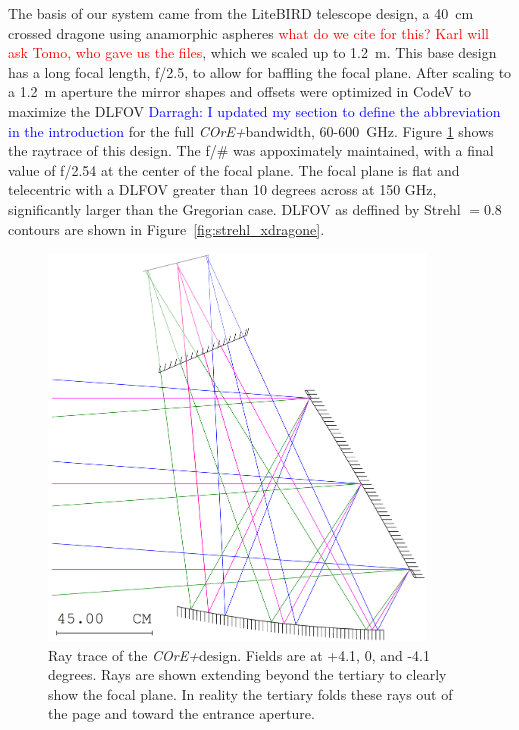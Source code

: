 \documentclass[11pt,a4paper]{article}
\newcommand{\comred}[1]{\textcolor{red}{#1}}
\newcommand{\comblue}[1]{\textcolor{blue}{#1}}
\newcommand{\coreplus}{\textit{\negthinspace COrE+\/}}
\begin{document}
The basis of our system came from the LiteBIRD telescope design, a 40~cm crossed dragone using anamorphic 
aspheres 
\cite{litebird} \comred{what do we cite for this? Karl will ask Tomo, who gave us the files}, which we scaled up to 1.2~m. 
This base design has a long focal length, f/2.5, to allow 
for baffling the focal plane.  After scaling to a 1.2~m aperture the mirror shapes and offsets were optimized 
in CodeV to maximize the DLFOV \comblue{Darragh: I updated my section to define the abbreviation in the introduction} for the full \coreplus bandwidth, 60-600~GHz.  
Figure \ref{fig:raytrace_xdragone} 
shows the raytrace of this design. The f/\# was appoximately maintained, with a final value of f/2.54 at the 
center of the focal plane.
The focal plane is flat and telecentric with a DLFOV greater than 10 degrees across at 150 GHz, significantly larger than the 
Gregorian case.  DLFOV as deffined by Strehl $=0.8$ contours are shown in Figure~\ref{fig:strehl_xdragone}.


\begin{figure}[htbp] %
	\centering
	\includegraphics[width=10cm]{xdragone_raytrace.png} 
	\caption{Ray trace of the \coreplus design. Fields are at +4.1, 0, and -4.1 degrees. Rays are shown extending beyond the tertiary 
		to clearly show the focal plane.  In reality the tertiary folds these rays out of the page and toward the entrance 
		aperture.  
	}
	\label{fig:raytrace_xdragone}
\end{figure}
\end{document}
